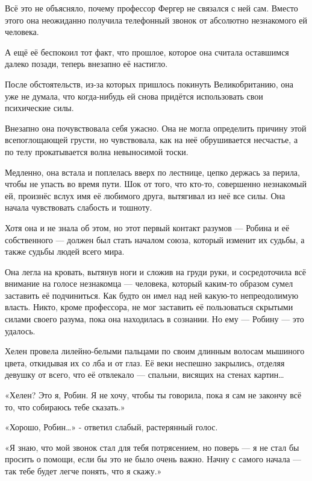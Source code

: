 \documentclass[a5paper, 9pt,
final, openany, twoside=true]{memoir}
\begin{document}
Всё это не объясняло, почему профессор Фергер не связался с ней сам. Вместо этого она неожиданно получила телефонный звонок от абсолютно незнакомого ей человека.

А ещё её беспокоил тот факт, что прошлое, которое она считала оставшимся далеко позади, теперь внезапно её настигло.

После обстоятельств, из-за которых пришлось покинуть Великобританию, она уже не думала, что когда-нибудь ей снова придётся использовать свои психические силы.

Внезапно она почувствовала себя ужасно. Она не могла определить причину этой всепоглощающей грусти, но чувствовала, как на неё обрушивается несчастье, а по телу прокатывается волна невыносимой тоски.

Медленно, она встала и поплелась вверх по лестнице, цепко держась за перила, чтобы не упасть во время пути. Шок от того, что кто-то, совершенно незнакомый ей, произнёс вслух имя её любимого друга, вытягивал из неё все силы. Она начала чувствовать слабость и тошноту.\bigskip

Хотя она и не знала об этом, но этот первый контакт разумов — Робина и её собственного — должен был стать началом союза, который изменит их судьбы, а также судьбы людей всего мира.

Она легла на кровать, вытянув ноги и сложив на груди руки, и сосредоточила всё внимание на голосе незнакомца — человека, который каким-то образом сумел заставить её подчиниться. Как будто он имел над ней какую-то непреодолимую власть. Никто, кроме профессора, не мог заставить её пользоваться скрытыми силами своего разума, пока она находилась в сознании. Но ему — Робину — это удалось.

Хелен провела лилейно-белыми пальцами по своим длинным волосам мышиного цвета, откидывая их со лба и от глаз. Её веки неспешно закрылись, отделяя девушку от всего, что её отвлекало — спальни, висящих на стенах картин…\bigskip

«Хелен? Это я, Робин. Я не хочу, чтобы ты говорила, пока я сам не закончу всё то, что собираюсь тебе сказать.»

«Хорошо, Робин…» - ответил слабый, растерянный голос.

«Я знаю, что мой звонок стал для тебя потрясением, но поверь — я не стал бы просить о помощи, если бы это не было очень важно. Начну с самого начала — так тебе будет легче понять, что я скажу.»
\end{document}
